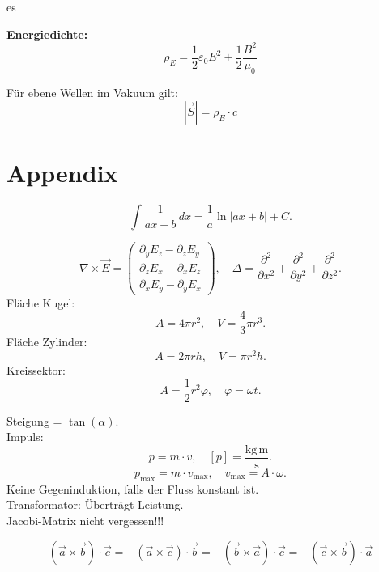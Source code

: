 es\documentclass[a4paper, fontsize=8pt, landscape]{scrartcl}
\begin{document}
\begin{multicols*}{4}
\textbf{Energiedichte:}
\[
\rho_E = \frac{1}{2} \varepsilon_0 E^2 + \frac{1}{2} \frac{B^2}{\mu_0}
\]

Für ebene Wellen im Vakuum gilt:
\[
|\vec{S}| = \rho_E \cdot c
\]

\section*{Appendix}
\[\int \frac{1}{a x + b}\,dx = \frac{1}{a} \ln\bigl|a x + b\bigr| + C.\]

\[\nabla \times \vec E = 
\begin{pmatrix}
\partial_y E_z - \partial_z E_y \\
\partial_z E_x - \partial_x E_z \\
\partial_x E_y - \partial_y E_x
\end{pmatrix},
\quad
\Delta = \frac{\partial^2}{\partial x^2} + \frac{\partial^2}{\partial y^2} + \frac{\partial^2}{\partial z^2}.\]
Fläche Kugel:
\[A = 4\pi r^2,\quad V = \frac{4}{3}\pi r^3.\]
Fläche Zylinder:
\[A = 2\pi r h,\quad V = \pi r^2 h.\]
Kreissektor:
\[A = \frac{1}{2}r^2 \varphi,\quad \varphi = \omega t.\]

Steigung = \(\tan(\alpha)\).\\

Impuls: 
\[p = m\cdot v,\quad [p] = \frac{\text{kg}\,\text{m}}{\text{s}}.\]
\[p_{\text{max}} = m \cdot v_{\text{max}},\quad v_{\text{max}} = A \cdot \omega.\]
Keine Gegeninduktion, falls der Fluss konstant ist.\\

Transformator: Überträgt Leistung.\\

Jacobi-Matrix nicht vergessen!!!

\[
(\vec{a} \times \vec{b}) \cdot \vec{c}
= - (\vec{a} \times \vec{c}) \cdot \vec{b}
= - (\vec{b} \times \vec{a}) \cdot \vec{c}
= - (\vec{c} \times \vec{b}) \cdot \vec{a}
\]
\columnbreak

\end{multicols*}
\end{document}
